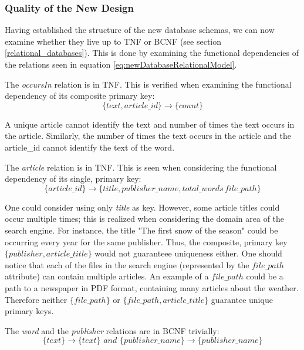 \subsubsection*{Quality of the New Design}
Having established the structure of the new database schemas, we can now examine whether they live up to TNF or BCNF (see section \ref{relational_databases}).
This is done by examining the functional dependencies of the relations seen in equation \ref{eq:newDatabaseRelationalModel}.

The \textit{occursIn} relation is in TNF. 
This is verified when examining the functional dependency of its composite primary key:
\begin{equation*}
 \{text,article\_id\}\rightarrow \{count\}   
\end{equation*}

A unique article cannot identify the text and number of times the text occurs in the article.
Similarly, the number of times the text occurs in the article and the article\_id cannot identify the text of the word.

The \textit{article} relation is in TNF. 
This is seen when considering the functional dependency of its single, primary key:
\begin{equation*}
    \{article\_id\} \rightarrow \{title, publisher\_name,total\_words\, file\_path\}
\end{equation*}

One could consider using only \textit{title} as key. 
However, some article titles could occur multiple times; this is realized when considering the domain area of the \knox{} search engine.
For instance, the title "The first snow of the season" could be occurring every year for the same publisher.
Thus, the composite, primary key $\{ publisher,article\_title \}$ would not guaranteee uniqueness either.
One should notice that each of the files in the search engine (represented by the $file\_path$ attribute) can contain multiple articles.
An example of a $file\_path$ could be a path to a newspaper in PDF format, containing many articles about the weather.
Therefore neither $\{file\_path\}$ or $\{ file\_path, article\_title \}$ guarantee unique primary keys.


The \textit{word} and the \textit{publisher} relations are in BCNF trivially:
\begin{equation*}
    \{ text\} \rightarrow \{text\} \textit{\ and\ } \{ publisher\_name \} \rightarrow \{ publisher\_name\}
\end{equation*}

